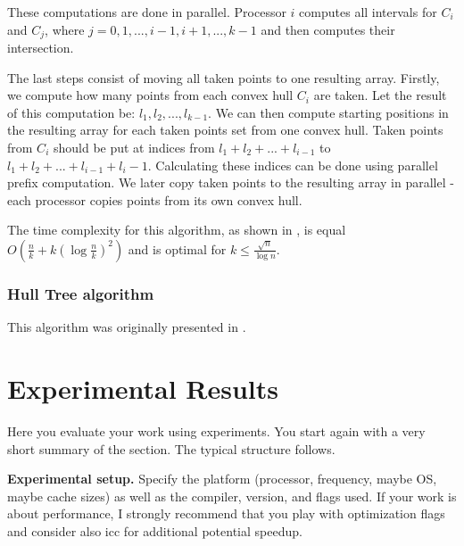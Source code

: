 \documentclass[letterpaper]{article}
\newcommand{\mypar}[1]{{\bf #1.}}
\theoremstyle{definition}
\begin{document}
These computations are done in parallel.
Processor $i$ computes all intervals for $C_i$ and $C_j$, where $j = 0, 1, ..., i -1, i+ 1, ..., k - 1$ and then computes their intersection.

The last steps consist of moving all taken points to one resulting array.
Firstly, we compute how many points from each convex hull $C_i$ are taken.
Let the result of this computation be: $l_1, l_2, ..., l_{k-1}$.
We can then compute starting positions in the resulting array for each taken points set from one convex hull.
Taken points from $C_i$ should be put at indices from $l_1 + l_2 + ... + l_{i-1}$ to $l_1 + l_2 + ... + l_{i-1} + l_i - 1$.
Calculating these indices can be done using parallel prefix computation.
We later copy taken points to the resulting array in parallel - each processor copies points from its own convex hull.


The time complexity for this algorithm, as shown in \cite{SimpleParallel}, is equal $O(\frac{n}{k} + k(\log \frac{n}{k})^2)$ and is optimal for $k \leq \frac{\sqrt{n}}{\log n}$.

\subsubsection{Hull Tree algorithm}

This algorithm was originally presented in \cite{HullTree}.

\section{Experimental Results}\label{sec:exp}

Here you evaluate your work using experiments. You start again with a
very short summary of the section. The typical structure follows.

\mypar{Experimental setup} Specify the platform (processor, frequency, maybe OS, maybe cache sizes)
as well as the compiler, version, and flags used. If your work is about performance, 
I strongly recommend that you play with optimization flags and consider also icc for additional potential speedup.
\end{document}
